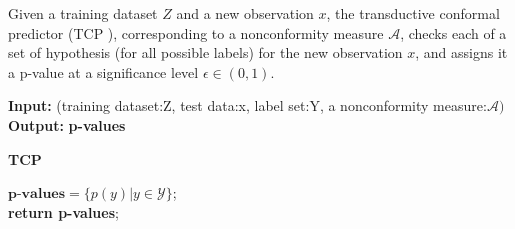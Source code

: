 \documentclass[main]{subfiles}
\begin{document}
\begin{definition}
Given a training dataset $Z$ and a new observation $x$, the transductive conformal predictor (TCP ), corresponding to a nonconformity measure $\mathcal{A}$, checks each of a set of hypothesis (for all possible labels) for the new observation $x$, and assigns it a p-value at a significance level $\epsilon \in (0, 1)$.  %
\end{definition}


\begin{algorithm}[H]
 \textbf{Input:}{ (training dataset:Z, test data:x, label set:Y, a nonconformity measure:$\mathcal{A})$}\\
 \textbf{Output:}{\textbf{ p-values} }\\
 \caption{\textbf{TCP}}
 $\textbf{p-values} = \{ p(y)| y \in \mathcal{Y}\}$;\\
 \textbf{return \textbf{p-values}};\\
 \end{algorithm}
 
\end{document}
